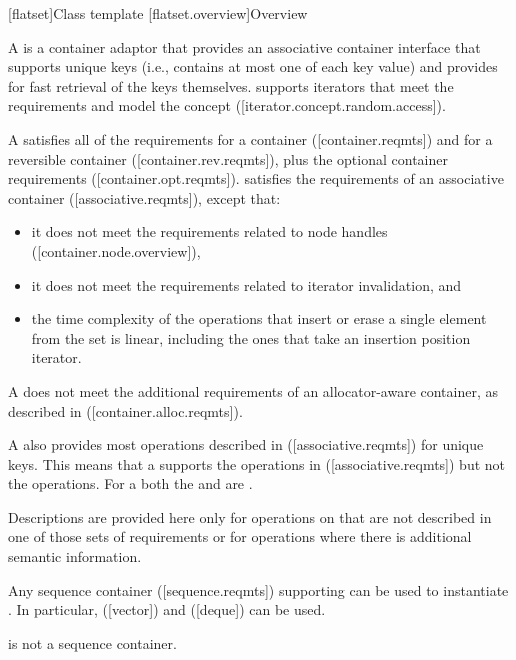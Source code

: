 \noindent\makebox[\linewidth]{\rule{\textwidth}{0.4pt}}

\begin{addedblock}
[flatset]{Class template }
[flatset.overview]{Overview}

\pnum
{}%
A  is a container adaptor that provides an associative
container interface that supports unique keys (i.e., contains at most one of each
key value) and provides for fast retrieval of the keys
themselves.  supports iterators that meet the
 requirements and model the 
concept ([iterator.concept.random.access]).

\pnum
A  satisfies all of the requirements for a container
([container.reqmts]) and for a reversible container ([container.rev.reqmts]),
plus the optional container requirements ([container.opt.reqmts]).  
satisfies the requirements of an associative container ([associative.reqmts]), except that:
\begin{itemize}
\item it does not meet the requirements related to node handles ([container.node.overview]),
\item it does not meet the requirements related to iterator invalidation, and
\item the time complexity of the operations that insert or erase a single
element from the set is linear, including the ones that take an insertion
position iterator.
\end{itemize}
\begin{note}A  does not meet the additional requirements of an
allocator-aware container, as described in ([container.alloc.reqmts]).\end{note}

\pnum
A  also provides most operations described
in ([associative.reqmts]) for unique keys.  This means that a
 supports the  operations
in ([associative.reqmts]) but not the  operations.  For a
 both the  and  are
.

\pnum
Descriptions are provided here only for operations on  that
are not described in one of those sets of requirements or for operations where
there is additional semantic information.

\pnum
Any sequence container ([sequence.reqmts]) supporting 
can be used to instantiate . In particular, 
([vector]) and  ([deque]) can be
used.  \begin{note} is not a sequence container.\end{note}


\end{addedblock}
